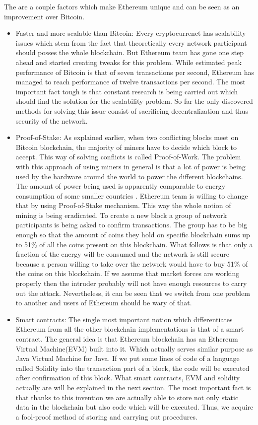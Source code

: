 \documentclass[a4paper,12pt,twoside,openany]{report}
\begin{document}
The are a couple factors which make Ethereum unique and can be seen as an improvement over Bitcoin. 
\begin{itemize}
\item Faster and more scalable than Bitcoin: Every cryptocurrenct has scalability issues which stem from the fact that theoretically every network participant should posses the whole blockchain. But Ethereum team has gone one step ahead and started creating tweaks for this problem. While estimated peak performance of Bitcoin is that of seven transactions per second, Ethereum has managed to reach performance of twelve transactions per second. The most important fact tough is that constant research is being carried out which should find the solution for the scalability problem. So far the only discovered methods for solving this issue consist of sacrificing decentralization and thus security of the network.

\item Proof-of-Stake: As explained earlier, when two conflicting blocks meet on Bitcoin blockchain, the majority of miners have to decide which block to accept. This way of solving conflicts is called Proof-of-Work. The problem with this approach of using miners in general is that a lot of power is being used by the hardware around the world to power the different blockchains. The amount of power being used is apparently comparable to energy consumption of some smaller countries \cite{energy}.  Ethereum team is willing to change that by using Proof-of-Stake mechanism. This way the whole notion of mining is being eradicated. To create a new block a group of network participants is being asked to confirm transactions. The group has to be big enough so that the amount of coins they hold on specific blockchain sums up to 51\% of all the coins present on this blockchain. What follows is that only a fraction of the energy will be consumed and the network is still secure because a person willing to take over the network would have to buy 51\% of the coins on this blockchain. If we assume that market forces are working properly then the intruder probably will not have enough resources to carry out the attack. Nevertheless, it can be seen that we switch from one problem to another and users of Ethereum should be wary of that. 

\item Smart contracts: The single most important notion which differentiates Ethereum from all the other blockchain implementations is that of a smart contract. The general idea is that Ethereum blockchain has an Ethereum Virtual Machine(EVM) built into it. Which actually serves similar purpose as Java Virtual Machine for Java. If we put some lines of code of a language called Solidity into the transaction part of a block, the code will be executed after confirmation of this block. What smart contracts, EVM and solidity actually are will be explained in the next section. The most important fact is that thanks to this invention we are actually able to store not only static data in the blockchain but also code which will be executed. Thus, we acquire a fool-proof method of storing and carrying out procedures.
\end{itemize}
\end{document}
